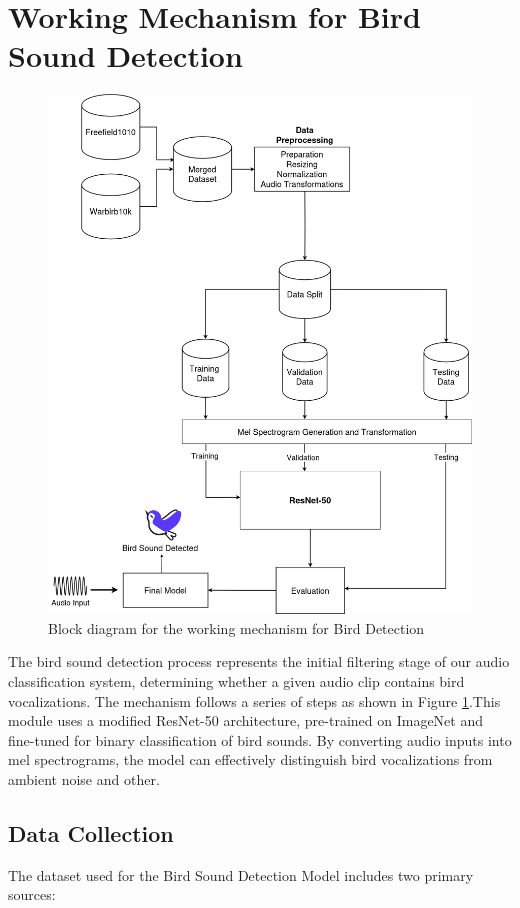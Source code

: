 \section{Working Mechanism for Bird Sound Detection}
      \begin{figure}[h!]
            \centering
            \includegraphics[scale=0.33]{images/MajorProject-Detection.png}
            \caption{Block diagram for the working mechanism for Bird Detection}
            \label{fig:working_bird_det}
      \end{figure}
      \newpage
      The bird sound detection process represents the initial filtering stage of our audio classification system, determining whether a given audio clip contains bird vocalizations. The mechanism follows a series of steps as shown in Figure \ref{fig:working_bird_det}.This module uses a modified ResNet-50 architecture, pre-trained on ImageNet and fine-tuned for binary classification of bird sounds. By converting audio inputs into mel spectrograms, the model can effectively distinguish bird vocalizations from ambient noise and other.
      \subsection{Data Collection}
      The dataset used for the Bird Sound Detection Model includes two primary sources:

